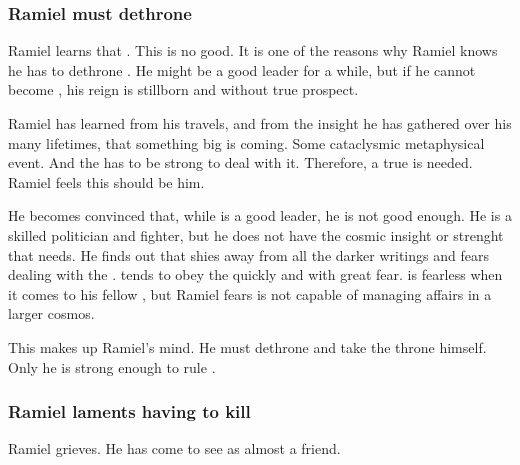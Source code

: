 \subsubsection{Ramiel must dethrone \Dasteron}
Ramiel learns that . 
This is no good. 
It is one of the reasons why Ramiel knows he has to dethrone \Dasteron. 
He might be a good leader for a while, but if he cannot become \apex{}, his reign is stillborn and without true prospect. 

Ramiel has learned from his travels, and from the insight he has gathered over his many lifetimes, that something big is coming. 
Some cataclysmic metaphysical event. 
And the \Mystraacht{} \matrix{} has to be strong to deal with it. 
Therefore, a true \apex{} is needed. 
Ramiel feels this \apex{} should be him. 

He becomes convinced that, while \Dasteron is a good leader, he is not good enough.
He is a skilled politician and fighter, but he does not have the cosmic insight or \vertex strenght that \Mystraacht needs.
He finds out that \Dasteron shies away from all the darker writings and fears dealing with the \banes.
\Dasteron tends to obey the \banes quickly and with great fear.
\Dasteron is fearless when it comes to his fellow \resphain, but Ramiel fears \Dasteron is not capable of managing \resphan affairs in a larger cosmos.

This makes up Ramiel's mind.
He must dethrone \Dasteron and take the throne himself.
Only he is strong enough to rule \Mystraacht. 





\subsubsection{Ramiel laments having to kill \Dasteron}
Ramiel grieves. 
He has come to see \Dasteron as almost a friend. 


